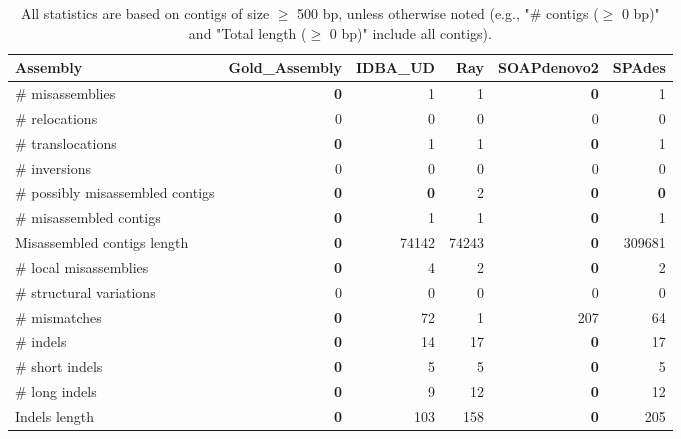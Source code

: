 \documentclass[12pt,a4paper]{article}
\begin{document}
\begin{table}[ht]
\begin{center}
\caption{All statistics are based on contigs of size $\geq$ 500 bp, unless otherwise noted (e.g., "\# contigs ($\geq$ 0 bp)" and "Total length ($\geq$ 0 bp)" include all contigs).}
\begin{tabular}{|l*{5}{|r}|}
\hline
Assembly & Gold\_Assembly & IDBA\_UD & Ray & SOAPdenovo2 & SPAdes \\ \hline
\# misassemblies & {\bf 0} & 1 & 1 & {\bf 0} & 1 \\ \hline
\hspace{5mm}\# relocations & 0 & 0 & 0 & 0 & 0 \\ \hline
\hspace{5mm}\# translocations & {\bf 0} & 1 & 1 & {\bf 0} & 1 \\ \hline
\hspace{5mm}\# inversions & 0 & 0 & 0 & 0 & 0 \\ \hline
\# possibly misassembled contigs & {\bf 0} & {\bf 0} & 2 & {\bf 0} & {\bf 0} \\ \hline
\# misassembled contigs & {\bf 0} & 1 & 1 & {\bf 0} & 1 \\ \hline
Misassembled contigs length & {\bf 0} & 74142 & 74243 & {\bf 0} & 309681 \\ \hline
\# local misassemblies & {\bf 0} & 4 & 2 & {\bf 0} & 2 \\ \hline
\# structural variations & 0 & 0 & 0 & 0 & 0 \\ \hline
\# mismatches & {\bf 0} & 72 & 1 & 207 & 64 \\ \hline
\# indels & {\bf 0} & 14 & 17 & {\bf 0} & 17 \\ \hline
\hspace{5mm}\# short indels & {\bf 0} & 5 & 5 & {\bf 0} & 5 \\ \hline
\hspace{5mm}\# long indels & {\bf 0} & 9 & 12 & {\bf 0} & 12 \\ \hline
Indels length & {\bf 0} & 103 & 158 & {\bf 0} & 205 \\ \hline
\end{tabular}
\end{center}
\end{table}
\end{document}
